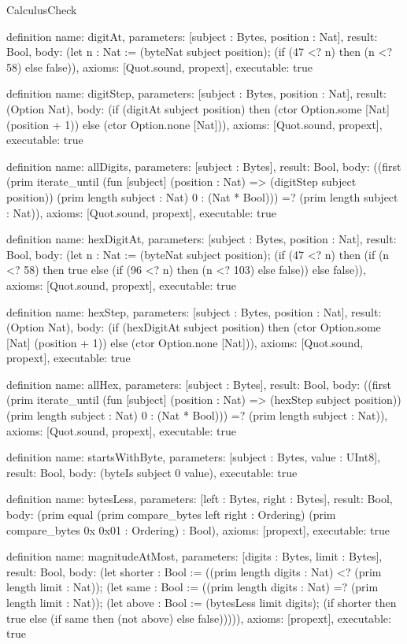 \begin{lexlean}{CalculusCheck}
\begin{semanticmodule}
definition{
  name: digitAt,
  parameters: [subject : Bytes, position : Nat],
  result: Bool,
  body: (let n : Nat := (byteNat subject position); (if (47 <? n) then (n <? 58) else false)),
  axioms: [Quot.sound, propext],
  executable: true
}

definition{
  name: digitStep,
  parameters: [subject : Bytes, position : Nat],
  result: (Option Nat),
  body: (if (digitAt subject position) then (ctor Option.some [Nat] (position + 1)) else (ctor Option.none [Nat])),
  axioms: [Quot.sound, propext],
  executable: true
}

definition{
  name: allDigits,
  parameters: [subject : Bytes],
  result: Bool,
  body: ((first (prim iterate_until (fun [subject] (position : Nat) => (digitStep subject position)) (prim length subject : Nat) 0 : (Nat * Bool))) =? (prim length subject : Nat)),
  axioms: [Quot.sound, propext],
  executable: true
}

definition{
  name: hexDigitAt,
  parameters: [subject : Bytes, position : Nat],
  result: Bool,
  body: (let n : Nat := (byteNat subject position); (if (47 <? n) then (if (n <? 58) then true else (if (96 <? n) then (n <? 103) else false)) else false)),
  axioms: [Quot.sound, propext],
  executable: true
}

definition{
  name: hexStep,
  parameters: [subject : Bytes, position : Nat],
  result: (Option Nat),
  body: (if (hexDigitAt subject position) then (ctor Option.some [Nat] (position + 1)) else (ctor Option.none [Nat])),
  axioms: [Quot.sound, propext],
  executable: true
}

definition{
  name: allHex,
  parameters: [subject : Bytes],
  result: Bool,
  body: ((first (prim iterate_until (fun [subject] (position : Nat) => (hexStep subject position)) (prim length subject : Nat) 0 : (Nat * Bool))) =? (prim length subject : Nat)),
  axioms: [Quot.sound, propext],
  executable: true
}

definition{
  name: startsWithByte,
  parameters: [subject : Bytes, value : UInt8],
  result: Bool,
  body: (byteIs subject 0 value),
  executable: true
}

definition{
  name: bytesLess,
  parameters: [left : Bytes, right : Bytes],
  result: Bool,
  body: (prim equal (prim compare_bytes left right : Ordering) (prim compare_bytes 0x 0x01 : Ordering) : Bool),
  axioms: [propext],
  executable: true
}

definition{
  name: magnitudeAtMost,
  parameters: [digits : Bytes, limit : Bytes],
  result: Bool,
  body: (let shorter : Bool := ((prim length digits : Nat) <? (prim length limit : Nat)); (let same : Bool := ((prim length digits : Nat) =? (prim length limit : Nat)); (let above : Bool := (bytesLess limit digits); (if shorter then true else (if same then (not above) else false))))),
  axioms: [propext],
  executable: true
}


\end{semanticmodule}
\end{lexlean}
